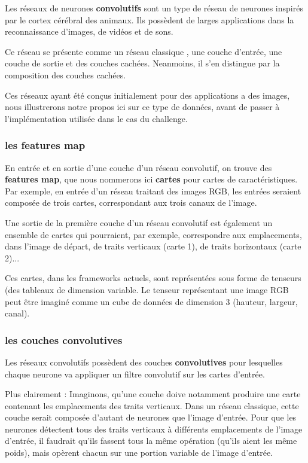 Les réseaux de neurones \textbf{convolutifs} sont un type de réseau de neurones
inspirés par le cortex cérébral des animaux.
Ils possèdent de larges applications dans la reconnaissance d'images, de vidéos
et de sons.

Ce réseau se présente comme un réseau classique , une couche d'entrée,
une couche de sortie et des couches cachées.
Neanmoins, il s'en distingue par la composition des couches cachées.

Ces réseaux ayant été conçus initialement pour des applications a des images,
nous illustrerons notre propos ici sur ce type de données, avant de passer
à l'implémentation utilisée dans le cas du challenge.

\subsubsection{les features map}

En entrée et en sortie d'une couche d'un réseau convolutif, on trouve des
\textbf{features map}, que nous nommerons ici \textbf{cartes} pour cartes de
caractéristiques.
Par exemple, en entrée d'un réseau traitant des images RGB, les entrées
seraient composée de trois cartes, correspondant aux trois canaux de l'image.

Une sortie de la première couche d'un réseau convolutif est également un
ensemble de cartes qui pourraient, par exemple, correspondre aux emplacements,
dans l'image de départ, de traits verticaux (carte 1), de traits horizontaux
(carte 2)...

Ces cartes, dans les frameworks actuels, sont représentées sous forme de
tenseurs (des tableaux de dimension variable.
Le tenseur représentant une image RGB peut être imaginé comme un cube de données
de dimension 3 (hauteur, largeur, canal).

\subsubsection{les couches convolutives}

Les réseaux convolutifs possèdent des couches \textbf{convolutives}
pour lesquelles chaque neurone va appliquer un filtre convolutif
sur les cartes d'entrée.

Plus clairement : Imaginons, qu'une couche doive notamment produire une carte
contenant les emplacements des traits verticaux. Dans un réseau classique,
cette couche serait composée d'autant de neurones que l'image d'entrée.
Pour que les neurones détectent tous des traits verticaux à différents
emplacements de l'image d'entrée, il faudrait qu'ils fassent tous la même
opération (qu'ils aient les même poids), mais opèrent chacun sur une portion variable de l'image d'entrée.

